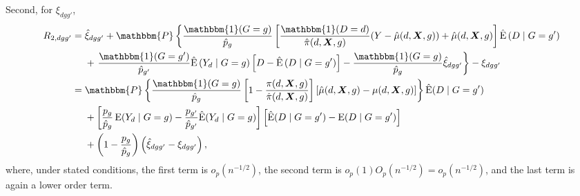 \documentclass[12pt,a4paper]{article}
\newcommand{\E}{\operatorname{E}}
\def\X{{\boldsymbol X}}
\def\one{\mathbbm{1}}
\def\P{\mathbbm{P}}
\begin{document}

Second, for $\xi_{dgg'}$,
\begin{align*}
    R_{2,dgg'} &= \hat{\xi}_{dgg'}+\P \left\{\frac{\one(G=g)}{\hat{p}_g}  \left[\frac{\one(D=d)}{\hat{\pi}(d,\X,g)}(Y-\hat{\mu}(d,\X,g)) + \hat{\mu}(d,\X,g) \right] \hat{\E} \left(D \mid G=g' \right) \right. \\
    &\phantom{{}={}} + \left. \frac{\one(G=g')}{\hat{p}_{g'}} \hat{\E} \left(Y_d \mid G=g \right) \left[D - \hat{\E} \left(D \mid G=g' \right) \right] - \frac{\one(G=g)}{\hat{p}_g} \hat{\xi}_{dgg'} \right\} - \xi_{dgg'} \\
    &= \P \left\{ \frac{\one(G=g)}{\hat{p}_g} \left[1-\frac{\pi(d,\X,g)}{\hat{\pi}(d,\X,g)} \right]\left[\hat{\mu}(d,\X,g)-\mu(d,\X,g)\right] \right\} \hat{\E}(D\mid G=g') \\
    &\phantom{{}={}} + \left[\frac{p_g}{\hat{p}_g} \E(Y_d \mid G=g) - \frac{p_{g'}}{\hat{p}_{g'}}\hat{\E}(Y_d \mid G=g) \right] \left[\hat{\E}(D \mid G=g') - \E(D\mid G=g') \right] \\
    &\phantom{{}={}} + \left(1-\frac{p_g}{\hat{p}_g}\right) \left(\hat{\xi}_{dgg'}-\xi_{dgg'} \right),
\end{align*}
where, under stated conditions, the first term is $o_p(n^{-1/2})$, the second term is $o_p(1)O_p(n^{-1/2})=o_p(n^{-1/2})$, and the last term is again a lower order term. 
\end{document}
